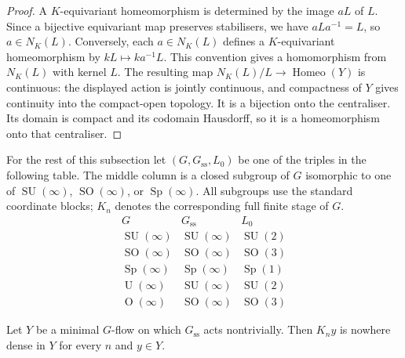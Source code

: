 \begin{proof}
A $K$-equivariant homeomorphism is determined by the image $aL$ of
$L$. Since a bijective equivariant map preserves stabilisers, we have
$aLa^{-1}=L$, so $a\in N_K(L)$. Conversely, each $a\in N_K(L)$
defines a $K$-equivariant homeomorphism by $kL\mapsto ka^{-1}L$.
This convention gives a homomorphism from $N_K(L)$ with kernel $L$.
The resulting map $N_K(L)/L\to\operatorname{Homeo}(Y)$ is continuous: the displayed
action is jointly continuous, and compactness of $Y$ gives continuity
into the compact-open topology. It is a bijection onto the centraliser.
Its domain is compact and its codomain Hausdorff, so it is a
homeomorphism onto that centraliser.
\end{proof}

For the rest of this subsection let $(G,G_{\mathrm{ss}},L_0)$ be one of the triples
in the following table. The middle column is a closed subgroup of $G$
isomorphic to one of $\operatorname{SU}(\infty)$, $\operatorname{SO}(\infty)$, or $\operatorname{Sp}(\infty)$.
All subgroups use the standard coordinate
blocks; $K_n$ denotes the corresponding full finite stage of $G$.
\[
\begin{array}{c|c|c}
G&G_{\mathrm{ss}}&L_0\\\hline
\operatorname{SU}(\infty)&\operatorname{SU}(\infty)&\operatorname{SU}(2)\\
\operatorname{SO}(\infty)&\operatorname{SO}(\infty)&\operatorname{SO}(3)\\
\operatorname{Sp}(\infty)&\operatorname{Sp}(\infty)&\operatorname{Sp}(1)\\
\operatorname{U}(\infty)&\operatorname{SU}(\infty)&\operatorname{SU}(2)\\
\operatorname{O}(\infty)&\operatorname{SO}(\infty)&\operatorname{SO}(3)
\end{array}
\]

\begin{lemma}\label{lem:ind-stage-orbits-nowhere-dense}
Let $Y$ be a minimal $G$-flow on which $G_{\mathrm{ss}}$ acts nontrivially.
Then $K_ny$ is nowhere dense in $Y$ for every $n$ and $y\in Y$.
\end{lemma}

